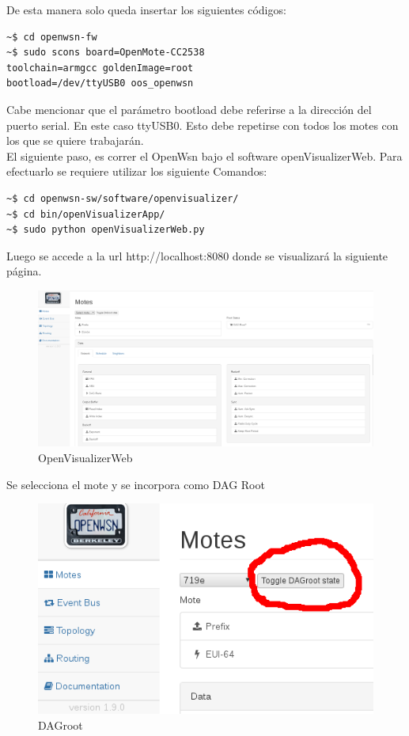\documentclass[journal]{IEEEtran}
\begin{document}
De esta manera solo queda insertar los siguientes códigos:
\begin{lstlisting}[frame=single]
~$ cd openwsn-fw        
~$ sudo scons board=OpenMote-CC2538
toolchain=armgcc goldenImage=root
bootload=/dev/ttyUSB0 oos_openwsn
\end{lstlisting}
Cabe mencionar que el parámetro bootload debe referirse a la dirección del puerto serial. En este caso ttyUSB0.
Esto debe repetirse con todos los motes con los que se quiere trabajarán.
\ \\
El siguiente paso, es correr el OpenWsn bajo el software openVisualizerWeb. Para efectuarlo se requiere utilizar los siguiente Comandos:
\begin{lstlisting}[frame=single]
~$ cd openwsn-sw/software/openvisualizer/
~$ cd bin/openVisualizerApp/
~$ sudo python openVisualizerWeb.py
\end{lstlisting}
Luego se accede a la url http://localhost:8080 donde se visualizará la siguiente página.
\\
\begin{figure}[!ht]
	\begin{center}
		\includegraphics[scale=0.13]{openweb.png}
	\end{center}			            
	\caption{OpenVisualizerWeb}        
\end{figure}
\newpage
Se selecciona el mote y se incorpora como DAG Root
\\
\begin{figure}[!ht]
	\begin{center}
		\includegraphics[scale=0.45]{dagroot.png}
	\end{center}			            
	\caption{DAGroot}        
\end{figure}
\\
\end{document}
